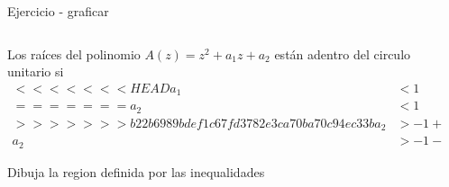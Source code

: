 \documentclass[presentation,aspectratio=169]{beamer}
\begin{document}
\begin{frame}[label={sec:orgf4b3c97}]{Ejercicio - graficar}
\begin{columns}
\begin{column}{0.5\columnwidth}
Los raíces del polinomio \(A(z) = z^2 + a_1z + a_2\) están adentro del circulo unitario si
\begin{align*}
<<<<<<< HEAD
a_1 &< 1\\
=======
a_2 &< 1\\
>>>>>>> b22b6989bdef1c67fd3782e3ca70ba70c94ec33b
a_2 &> -1+a_1\\
a_2 &> -1 - a_1
\end{align*}

\alert{Dibuja la region definida por las inequalidades}
\end{column}
\begin{column}{0.5\columnwidth}
\begin{center}
\end{center}
\end{column}
\end{columns}
\end{frame}
\end{document}
